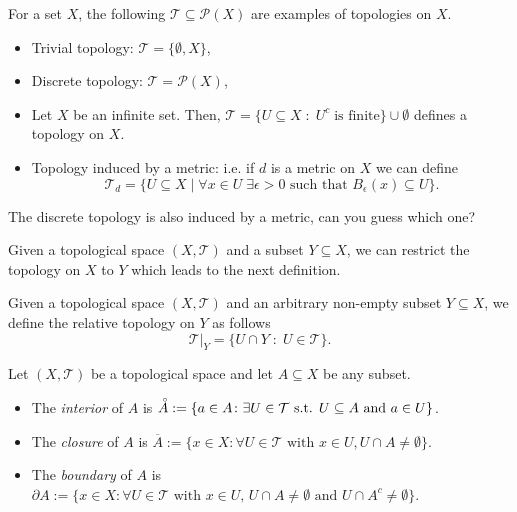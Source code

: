 \documentclass [aspectratio=169]{beamer}
\newcommand{\cP}{\mathcal{P}}
\newcommand{\cT}{\mathcal{T}}
\newcommand{\interior}{\accentset{\circ}}
\begin{document}
\begin{frame}
\begin{example}
For a set $X$, the following $\cT \subseteq \cP(X)$ are examples of topologies on $X$.
\vspace{0.4em}
\begin{itemize}
\setlength\itemsep{0.3em}
    \item Trivial topology: $\cT = \{\emptyset, X\}$,
    \item Discrete topology: $\cT=\cP(X)$,
    \item Let $X$ be an infinite set. Then, $\cT = \{U \subseteq X \;\colon\; U^c \; \text{is finite}\}\cup \emptyset$ defines a topology on $X$.
    \item Topology induced by a metric: i.e. if $d$ is a metric on $X$ we can define 
    $$\cT_d = \{U \subseteq X \; \vert \; \forall x \in U \; \exists \epsilon>0 \text{ such that } B_\epsilon(x) \subseteq U \}.$$
\end{itemize}
\vspace{0.4em}
    The discrete topology is also induced by a metric, can you guess which one?
\end{example}

\end{frame}


\begin{frame}
Given a topological space $(X,\cT)$ and a subset $Y\subseteq X$, we can restrict the topology on $X$ to $Y$ which leads to the next definition. 

\vspace{1em}

\begin{definition}
Given a topological space $(X,\cT)$ and an arbitrary non-empty subset $Y \subseteq X$, we define the relative topology on $Y$ as follows
\begin{equation*}
    \cT\vert_Y = \{U\cap Y \; \colon\; U \in \cT\}.
\end{equation*}
\end{definition}
\end{frame}


\begin{frame}
\begin{definition}
Let $(X,\cT)$ be a topological space and let $A\subseteq X$ be any subset.
\begin{itemize}
    \item The \emph{interior} of $A$ is $\interior A := \{a \in A \colon \exists U \in  \cT \text{ s.t. } U\subseteq A \text{ and } a\in U\} $.
    \item The \emph{closure} of $A$ is $\overline{A} := \{x \in X \colon \forall U \in \cT \text{ with } x \in U, U\cap A \neq \emptyset\}$.
    \item The \emph{boundary} of $A$ is $\partial A:= \{x \in X \colon \forall U\in \cT \text{ with } x\in U, \, U \cap A \neq \emptyset \text{ and } U \cap A^c \neq \emptyset \}$.
\end{itemize}
\end{definition}
\end{frame}
\end{document}
